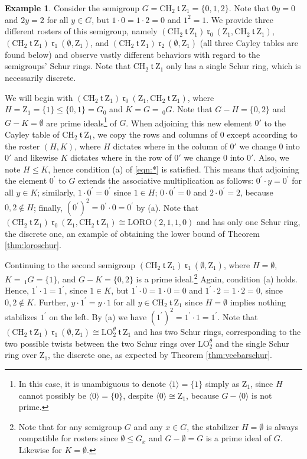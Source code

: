 \documentclass{article}
\theoremstyle{plain}
\theoremstyle{definition}
\newtheorem{Exam}[Thm]{Example}
\newcommand{\LO}{\mathrm{LO}}
\newcommand{\LORO}{\mathrm{LORO}}
\newcommand{\CH}{\mathrm{CH}}
\newcommand{\z}{\mathrm{Z}}
\renewcommand{\t}{\ \mathfrak{t}\ }
\renewcommand{\r}[1]{\ \mathfrak{r}_{#1}\ }
\begin{document}
\begin{Exam}
Consider the semigroup $G=\CH_2\t \z_1 = \{0,1,2\}$. Note that $0y=0$ and $2y=2$ for all $y\in G$, but $1\cdot 0 = 1\cdot 2 = 0$ and $1^2=1$. We provide three different rosters of this semigroup, namely $(\CH_2\t\z_1) \r{0}(\z_1, \CH_2\t\z_1)$, $(\CH_2\t\z_1) \r{1}(\emptyset, \z_1)$, and $(\CH_2\t\z_1) \r{2}(\emptyset,\z_1)$ (all three Cayley tables are found below) and observe vastly different behaviors with regard to the semigroups' Schur rings. Note that $\CH_2\t \z_1$ only has a single Schur ring, which is necessarily discrete.

We will begin with $(\CH_2\t\z_1) \r{0}(\z_1,\CH_2\t\z_1)$, where $H=\z_1=\{1\} \leq \{0, 1\} = G_0$ and $K=G=\,_0G$. Note that $G - H = \{0,2\}$ and $G-K=\emptyset$ are prime ideals\footnote{In this case, it is unambiguous to denote $\langle 1\rangle=\{1\}$ simply as $\z_1$, since $H$ cannot possibly be $\langle 0 \rangle = \{0\}$, despite $\langle 0\rangle \cong\z_1$,  because $G-\langle 0\rangle$ is not prime.} of $G$. When adjoining this new element $0'$ to the Cayley table of $\CH_2\t\z_1$, we copy the rows and columns of $0$ except according to the roster $(H,K)$, where $H$ dictates where in the column of $0'$ we change $0$ into $0'$ and likewise $K$ dictates where in the row of $0'$ we change $0$ into $0'$. Also, we note $H\leq K$, hence condition (a) of \eqref{eqn:*} is satisfied. This means that adjoining the element $0^\prime$ to $G$ extends the associative multiplication as follows: $0^\prime \cdot y = 0^\prime$ for all $y\in K$; similarly, $1\cdot 0^\prime = 0^\prime$ since $1\in H$; $0\cdot 0^\prime =0$ and $2\cdot 0^\prime=2$, because $0, 2\not\in H$; finally, $\left(0^\prime\right)^2 = 0^\prime \cdot 0 = 0^\prime$ by (a). Note that $(\CH_2\t\z_1) \r{0}(\z_1,\CH_2\t\z_1)\cong\LORO(2,1,1,0)$ and has only one Schur ring, the discrete one, an example of obtaining the lower bound of Theorem \ref{thm:loroschur}.

Continuing to the second semigroup $(\CH_2\t\z_1) \r{1}(\emptyset, \z_1)$, where $H=\emptyset$, $K=\,_1G = \{1\}$, and $G-K=\{0,2\}$ is a prime ideal.\footnote{Note that for any semigroup $G$ and any $x\in G$, the stabilizer $H=\emptyset$ is always compatible for rosters since $\emptyset\le G_x$ and $G-\emptyset = G$ is a prime ideal of $G$. Likewise for $K=\emptyset$.} Again, condition (a) holds. Hence, $1^\prime \cdot 1 = 1^\prime$, since $1\in K$, but $1^\prime\cdot 0 = 1\cdot 0 = 0$ and $1^\prime\cdot 2 = 1\cdot 2 = 0$, since $0, 2\not\in K$. Further, $y\cdot 1^\prime = y\cdot 1$ for all $y\in \CH_2\t\z_1$ since $H=\emptyset$ implies nothing stabilizes $1^\prime$ on the left. By (a) we have $(1^\prime)^2 = 1^\prime \cdot 1 = 1^\prime$. Note that $(\CH_2\t\z_1) \r{1}(\emptyset, \z_1)\cong\LO^\theta_2 \t \z_1$ and has two Schur rings, corresponding to the two possible twists between the two Schur rings over $\LO_2^\theta$ and the single Schur ring over $\z_1$, the discrete one, as expected by Theorem \ref{thm:veebarschur}.


\end{Exam}
\end{document}
